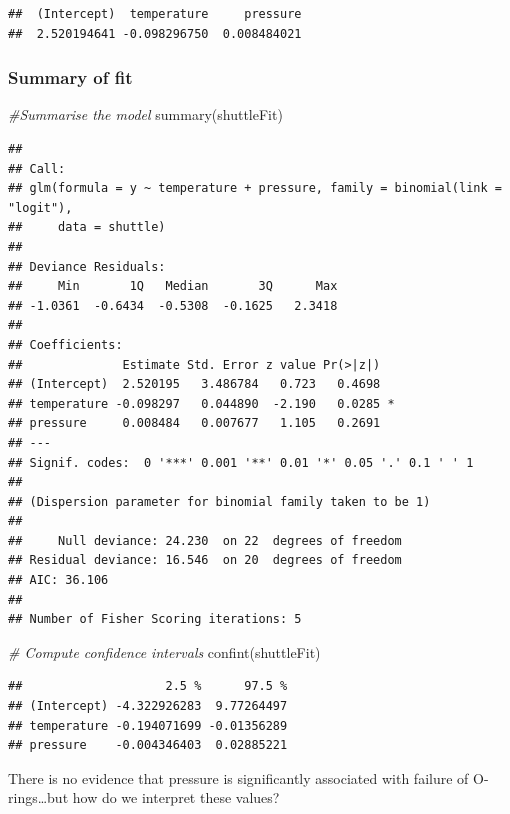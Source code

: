 \documentclass[
  openany]{book}
\newenvironment{Shaded}{\begin{snugshade}}{\end{snugshade}}
\newcommand{\CommentTok}[1]{\textcolor[rgb]{0.56,0.35,0.01}{\textit{#1}}}
\newcommand{\FunctionTok}[1]{\textcolor[rgb]{0.00,0.00,0.00}{#1}}
\newcommand{\NormalTok}[1]{#1}
\begin{document}
\begin{verbatim}
##  (Intercept)  temperature     pressure 
##  2.520194641 -0.098296750  0.008484021
\end{verbatim}

\hypertarget{summary-of-fit}{%
\subsubsection{Summary of fit}\label{summary-of-fit}}

\begin{Shaded}
\begin{Highlighting}[]
\CommentTok{\#Summarise the model}
\FunctionTok{summary}\NormalTok{(shuttleFit)}
\end{Highlighting}
\end{Shaded}

\begin{verbatim}
## 
## Call:
## glm(formula = y ~ temperature + pressure, family = binomial(link = "logit"), 
##     data = shuttle)
## 
## Deviance Residuals: 
##     Min       1Q   Median       3Q      Max  
## -1.0361  -0.6434  -0.5308  -0.1625   2.3418  
## 
## Coefficients:
##              Estimate Std. Error z value Pr(>|z|)  
## (Intercept)  2.520195   3.486784   0.723   0.4698  
## temperature -0.098297   0.044890  -2.190   0.0285 *
## pressure     0.008484   0.007677   1.105   0.2691  
## ---
## Signif. codes:  0 '***' 0.001 '**' 0.01 '*' 0.05 '.' 0.1 ' ' 1
## 
## (Dispersion parameter for binomial family taken to be 1)
## 
##     Null deviance: 24.230  on 22  degrees of freedom
## Residual deviance: 16.546  on 20  degrees of freedom
## AIC: 36.106
## 
## Number of Fisher Scoring iterations: 5
\end{verbatim}

\begin{Shaded}
\begin{Highlighting}[]
\CommentTok{\# Compute confidence intervals}
\FunctionTok{confint}\NormalTok{(shuttleFit)}
\end{Highlighting}
\end{Shaded}

\begin{verbatim}
##                    2.5 %      97.5 %
## (Intercept) -4.322926283  9.77264497
## temperature -0.194071699 -0.01356289
## pressure    -0.004346403  0.02885221
\end{verbatim}

There is no evidence that pressure is significantly associated with
failure of O-rings\ldots but how do we interpret these values?
\end{document}
